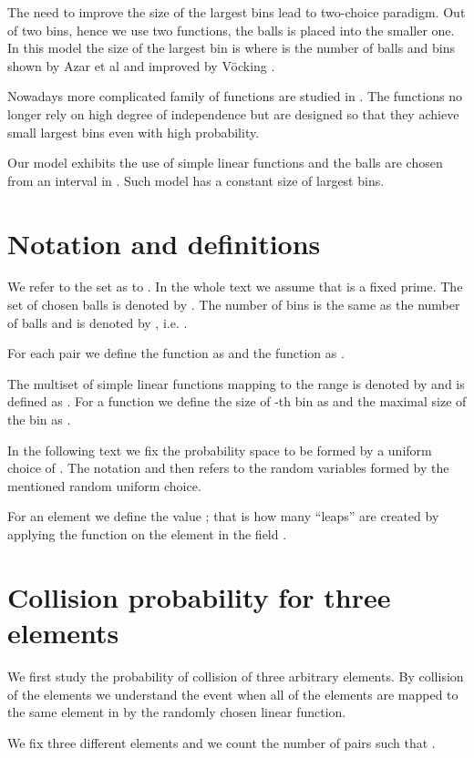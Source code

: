 \documentclass{article}
\begin{document}
The need to improve the size of the largest bins lead to two-choice paradigm. Out of two bins, hence we use two functions, the balls is placed into the smaller one. In this model the size of the largest bin is  where  is the number of balls and bins shown by Azar et al \cite{azar} and improved by V\"{o}cking \cite{vocking}.

Nowadays more complicated family of functions are studied in \cite{wieder}. The functions no longer rely on high degree of independence but are designed so that they achieve small largest bins even with high probability.

Our model exhibits the use of simple linear functions and the balls are chosen from an interval in . Such model has a constant size of largest bins.

\section{Notation and definitions}
\label{sec:notation}
We refer to the set  as to . 
In the whole text we assume that  is a fixed prime. 
The set of chosen balls is denoted by .
The number of bins is the same as the number of balls and is denoted by , i.e. .

For each pair  we define the function  as  and the function  as .

The multiset of simple linear functions mapping  to the range  is denoted by  and is defined as .
For a function  we define the size of -th bin as  and the maximal size of the bin as .

In the following text we fix the probability space to be formed by a uniform choice of .
The notation  and  then refers to the random variables formed by the mentioned random uniform choice.

For an element  we define the value ; that is how many ``leaps'' are created by applying the function  on the element  in the field .

\section{Collision probability for three elements}

We first study the probability of collision of three arbitrary elements.
By collision of the elements we understand the event when all of the elements are mapped to the same element in  by the randomly chosen linear function.

We fix three different elements  and we count the number of pairs  such that .
\end{document}
